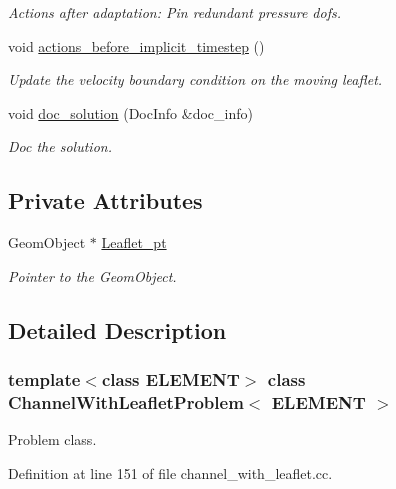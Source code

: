 \begin{DoxyCompactItemize}
\begin{DoxyCompactList}\small\item\em Actions after adaptation\+: Pin redundant pressure dofs. \end{DoxyCompactList}\item 
void \hyperlink{classChannelWithLeafletProblem_acef6ec771775162f77295a8f92d695ac}{actions\+\_\+before\+\_\+implicit\+\_\+timestep} ()
\begin{DoxyCompactList}\small\item\em Update the velocity boundary condition on the moving leaflet. \end{DoxyCompactList}\item 
void \hyperlink{classChannelWithLeafletProblem_adb8e1420844f7b40d71beae81111c4d0}{doc\+\_\+solution} (Doc\+Info \&doc\+\_\+info)
\begin{DoxyCompactList}\small\item\em Doc the solution. \end{DoxyCompactList}\end{DoxyCompactItemize}
\subsection*{Private Attributes}
\begin{DoxyCompactItemize}
\item 
Geom\+Object $\ast$ \hyperlink{classChannelWithLeafletProblem_ac32f0451749ec4e85d39246f5823a5f2}{Leaflet\+\_\+pt}
\begin{DoxyCompactList}\small\item\em Pointer to the Geom\+Object. \end{DoxyCompactList}\end{DoxyCompactItemize}


\subsection{Detailed Description}
\subsubsection*{template$<$class E\+L\+E\+M\+E\+NT$>$\newline
class Channel\+With\+Leaflet\+Problem$<$ E\+L\+E\+M\+E\+N\+T $>$}

Problem class. 

Definition at line 151 of file channel\+\_\+with\+\_\+leaflet.\+cc.



